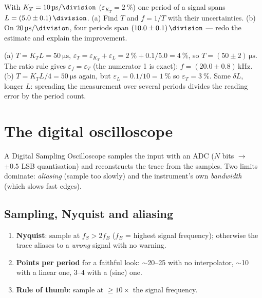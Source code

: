 \documentclass[11pt,a4paper,oneside]{book}
\begin{document}
\begin{exercise}
With $K_T=\qty{10}{\micro\second\per\division}$
($\varepsilon_{K_T}=\qty{2}{\percent}$) one period of a signal spans
$L=(5.0\pm0.1)\,\unit{\division}$. (a) Find $T$ and $f=1/T$ with their
uncertainties. (b) On $\qty{20}{\micro\second\per\division}$, four periods span
$(10.0\pm0.1)\,\unit{\division}$ --- redo the estimate and explain the
improvement.
\end{exercise}
\begin{solution}
(a) $T=K_TL=\qty{50}{\micro\second}$,
$\varepsilon_T=\varepsilon_{K_T}+\varepsilon_L=\qty{2}{\percent}+0.1/5.0
=\qty{4}{\percent}$, so $T=(50\pm2)\,\unit{\micro\second}$. The ratio rule gives
$\varepsilon_f=\varepsilon_T$ (the numerator 1 is exact):
$f=(20.0\pm0.8)\,\unit{\kilo\hertz}$.
(b) $T=K_TL/4=\qty{50}{\micro\second}$ again, but
$\varepsilon_L=0.1/10=\qty{1}{\percent}$ so
$\varepsilon_T=\qty{3}{\percent}$. Same $\delta L$, longer $L$: spreading the
measurement over several periods divides the reading error by the period count.
\end{solution}

\chapter{The digital oscilloscope}\label{ch:dso}

A Digital Sampling Oscilloscope samples the input with an ADC ($N$ bits $\to$
$\pm0.5$ LSB quantisation) and reconstructs the trace from the samples. Two
limits dominate: \emph{aliasing} (sample too slowly) and the instrument's own
\emph{bandwidth} (which slows fast edges).

\section{Sampling, Nyquist and aliasing}
\begin{protocol}
\begin{enumerate}[leftmargin=1.5cm]
  \item \textbf{Nyquist}: sample at $f_S>2f_B$ ($f_B$ = highest signal
        frequency); otherwise the trace aliases to a \emph{wrong} signal with no
        warning.
  \item \textbf{Points per period} for a faithful look: $\sim$20--25 with no
        interpolator, $\sim$10 with a linear one, 3--4 with a (sinc) one.
  \item \textbf{Rule of thumb}: sample at $\ge10\times$ the signal frequency.
\end{enumerate}
\end{protocol}
\end{document}
